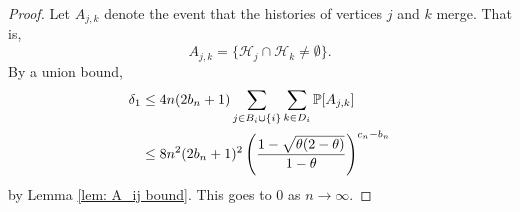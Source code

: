 \begin{proof}
		Let $A_{j,k}$ denote the event that the histories of vertices $j$ and $k$ merge. That is,
		\begin{equation}
			A_{j,k} = \{\mathcal{H}_j \cap \mathcal{H}_k \neq \emptyset\}.
		\end{equation}
		By a union bound,
		\begin{align}
			\delta_1 &\leq 4 n (2b_n + 1) \sum_{j \in B_i \cup \{i\}} \sum_{k \in D_i} \mathbb{P}[A_{j,k}]\\
			&\leq 8n^2(2b_n + 1)^2  \left(\frac{1 - \sqrt{\theta(2 - \theta)}}{1 - \theta}\right)^{c_n - b_n}
		\end{align}
		by Lemma \ref{lem: A_ij bound}. This goes to $0$ as $n \rightarrow \infty$.





	\end{proof}

